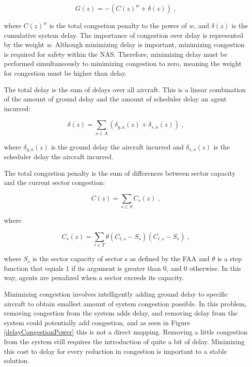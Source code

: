 \documentclass[onehalf,11pt]{beavtex}
\begin{document}
\begin{equation} \label{eq:Global}
G(z) = -(C(z)^w + \delta(z))\;,
\end{equation}

where $C(z)^w$ is the total congestion penalty to the power of $w$, and $\delta(z)$ is the cumulative system delay. The importance of congestion over delay is represented by the weight \textit{w}. Although minimizing delay is important, minimizing congestion is required for safety within the NAS. Therefore, minimizing delay must be performed simultaneously to minimizing congestion to zero, meaning the weight for congestion must be higher than delay.

The total delay is the sum of delays over all aircraft. This is a linear combination of the amount of ground delay and the amount of scheduler delay an agent incurred:

\begin{equation} \label{eq:Cumilative Delay}
\delta(z) = \displaystyle\sum\limits_{a \in A} (\delta_{g,a}(z) + \delta_{s,a}(z))\;,
\end{equation}

where $\delta_{g,a}(z)$ is the ground delay the aircraft incurred and $\delta_{s,a}(z)$ is the scheduler delay the aircraft incurred. 

The total congestion penalty is the sum of differences between sector capacity and the current sector congestion:

\begin{equation} \label{eq:Cumilative Congestion}
C(z) = \displaystyle\sum\limits_{s \in S} C_s(z)\;,
\end{equation}

where

\begin{equation}
C_s(z) = \displaystyle\sum\limits_{t \in T} \theta(C_{t,s} - S_s) (C_{t,s} - S_s)\;,
\end{equation}

where $S_s$ is the sector capacity of sector s as defined by the FAA and $\theta$ is a step function that equals 1 if its argument is greater than 0, and 0 otherwise. In this way, agents are penalized when a sector exceeds its capacity.

Minimizing congestion involves intelligently adding ground delay to specific aircraft to obtain smallest amount of system congestion possible. In this problem, removing congestion from the system adds delay, and removing delay from the system could potentially add congestion, and as seen in Figure \ref{delayCongestionPower} this is not a direct mapping. Removing a little congestion from the system still requires the introduction of quite a bit of delay. Minimizing this cost to delay for every reduction in congestion is important to a stable solution.
\end{document}
